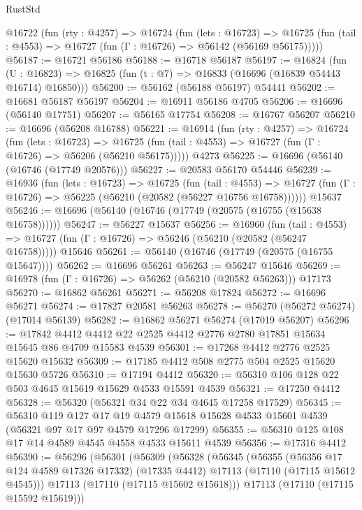 \begin{lexlean}{RustStd}
\begin{coremodule}
  @16722
    (fun (rty : @4257) =>
    @16724
      (fun (lets : @16723) =>
      @16725 (fun (tail : @4553) => @16727 (fun (Γ : @16726) => @56142 (@56169 @56175)))))
@56187 := @16721 @56186
@56188 := @16718 @56187
@56197 := @16824
    (fun (U : @16823) => @16825 (fun (t : @7) => @16833 (@16696 (@16839 @54443 @16714) @16850)))
@56200 := @56162 (@56188 @56197) @54441
@56202 := @16681 @56187 @56197
@56204 := @16911 @56186 @4705
@56206 := @16696 (@56140 @17751)
@56207 := @56165 @17754
@56208 := @16767 @56207
@56210 := @16696 (@56208 @16788)
@56221 := @16914
    (fun (rty : @4257) =>
    @16724
      (fun (lets : @16723) =>
      @16725 (fun (tail : @4553) => @16727 (fun (Γ : @16726) => @56206 (@56210 @56175)))))
    @4273
@56225 := @16696 (@56140 (@16746 (@17749 @20576)))
@56227 := @20583 @56170 @54446
@56239 := @16936
    (fun (lets : @16723) =>
    @16725
      (fun (tail : @4553) =>
      @16727 (fun (Γ : @16726) => @56225 (@56210 (@20582 (@56227 @16756 @16758))))))
    @15637
@56246 := @16696 (@56140 (@16746 (@17749 (@20575 (@16755 (@15638 @16758))))))
@56247 := @56227 @15637
@56256 := @16960
    (fun (tail : @4553) => @16727 (fun (Γ : @16726) => @56246 (@56210 (@20582 (@56247 @16758)))))
    @15646
@56261 := @56140 (@16746 (@17749 (@20575 (@16755 @15647))))
@56262 := @16696 @56261
@56263 := @56247 @15646
@56269 := @16978 (fun (Γ : @16726) => @56262 (@56210 (@20582 @56263))) @17173
@56270 := @16862 @56261
@56271 := @56208 @17824
@56272 := @16696 @56271
@56274 := @17827 @20581 @56263
@56278 := @56270 (@56272 @56274) (@17014 @56139)
@56282 := @16862 @56271 @56274 (@17019 @56207)
@56296 := @17842 @4412 @4412 @22 @2525 @4412 @2776 @2780 @17851 @15634 @15645 @86 @4709 @15583 @4539
@56301 := @17268 @4412 @2776 @2525 @15620 @15632
@56309 := @17185 @4412 @508 @2775 @504 @2525 @15620 @15630 @5726
@56310 := @17194 @4412
@56320 := @56310 @106 @128 @22 @503 @4645 @15619 @15629 @4533 @15591 @4539
@56321 := @17250 @4412
@56328 := @56320 (@56321 @34 @22 @34 @4645 @17258 @17529)
@56345 := @56310
    @119
    @127
    @17
    @19
    @4579
    @15618
    @15628
    @4533
    @15601
    @4539
    (@56321 @97 @17 @97 @4579 @17296 @17299)
@56355 := @56310 @125 @108 @17 @14 @4589 @4545 @4558 @4533 @15611 @4539
@56356 := @17316 @4412
@56390 := @56296
    (@56301
      (@56309
        (@56328
          (@56345
            (@56355
              (@56356 @17 @124 @4589 @17326 @17332)
              (@17335 @4412)
              @17113
              (@17110 (@17115 @15612 @4545)))
            @17113
            (@17110 (@17115 @15602 @15618)))
          @17113
          (@17110 (@17115 @15592 @15619)))

\end{coremodule}
\end{lexlean}
